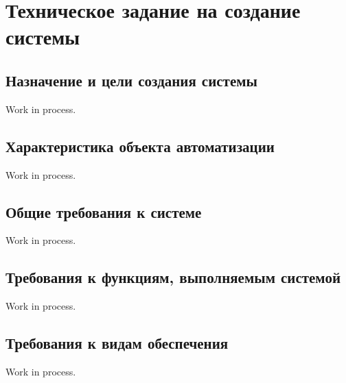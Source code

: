 \section{Техническое задание на создание системы}

\subsection{Назначение и цели создания системы}

Work in process.

\subsection{Характеристика объекта автоматизации}

Work in process.

\subsection{Общие требования к системе}

Work in process.

\subsection{Требования к функциям, выполняемым системой}

Work in process.

\subsection{Требования к видам обеспечения}

Work in process.

\clearpage
\newpage